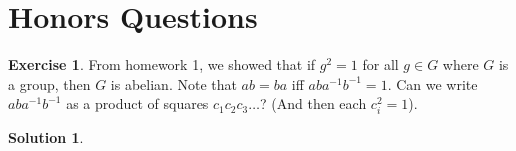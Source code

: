 \documentclass[12pt]{article}
\theoremstyle{definition}
\newtheorem{exercise}{Exercise}
\theoremstyle{definition}
\newtheorem{solution}{Solution}
\begin{document}
\section{Honors Questions}
\begin{exercise}
From homework 1, we showed that if $g^2 = 1$ for all $g \in G$ where $G$ is a group, then $G$ is abelian. Note that $ab = ba$ iff $aba^{-1}b^{-1} = 1$. Can we write $aba^{-1}b^{-1}$ as a product of squares $c_1 c_2 c_3 \ldots $? (And then each $c^2_i = 1$).
\end{exercise}
\begin{solution}

\end{solution}
\end{document}
